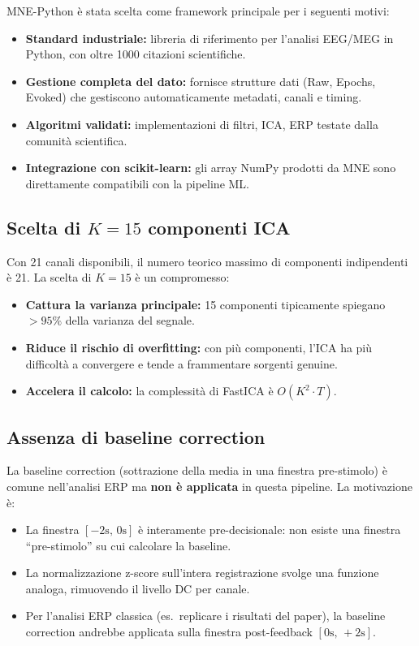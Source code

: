\documentclass[12pt, a4paper]{article}
\begin{document}
MNE-Python è stata scelta come framework principale per i seguenti motivi:
\begin{itemize}
    \item \textbf{Standard industriale:} libreria di riferimento per l'analisi EEG/MEG in Python, con oltre 1000 citazioni scientifiche.
    \item \textbf{Gestione completa del dato:} fornisce strutture dati (Raw, Epochs, Evoked) che gestiscono automaticamente metadati, canali e timing.
    \item \textbf{Algoritmi validati:} implementazioni di filtri, ICA, ERP testate dalla comunità scientifica.
    \item \textbf{Integrazione con scikit-learn:} gli array NumPy prodotti da MNE sono direttamente compatibili con la pipeline ML.
\end{itemize}

\subsection{Scelta di $K=15$ componenti ICA}

Con 21 canali disponibili, il numero teorico massimo di componenti indipendenti è 21. La scelta di $K=15$ è un compromesso:
\begin{itemize}
    \item \textbf{Cattura la varianza principale:} 15 componenti tipicamente spiegano $>95\%$ della varianza del segnale.
    \item \textbf{Riduce il rischio di overfitting:} con più componenti, l'ICA ha più difficoltà a convergere e tende a frammentare sorgenti genuine.
    \item \textbf{Accelera il calcolo:} la complessità di FastICA è $O(K^2 \cdot T)$.
\end{itemize}

\subsection{Assenza di baseline correction}

La baseline correction (sottrazione della media in una finestra pre-stimolo) è comune nell'analisi ERP ma \textbf{non è applicata} in questa pipeline. La motivazione è:
\begin{itemize}
    \item La finestra $[-2\text{s},\, 0\text{s}]$ è interamente pre-decisionale: non esiste una finestra ``pre-stimolo'' su cui calcolare la baseline.
    \item La normalizzazione z-score sull'intera registrazione svolge una funzione analoga, rimuovendo il livello DC per canale.
    \item Per l'analisi ERP classica (es.\ replicare i risultati del paper), la baseline correction andrebbe applicata sulla finestra post-feedback $[0\text{s},\, +2\text{s}]$.
\end{itemize}
\end{document}
